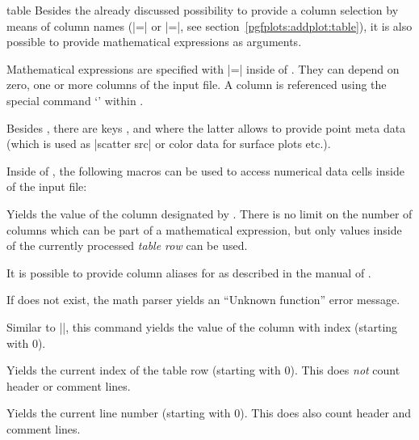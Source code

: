 \begin{addplotoperation}[]{table}{}
\label{pgfplots:addplot:table:expr}
	Besides the already discussed possibility to provide a column selection by means of column names (|=| or |=|, see section~\ref{pgfplots:addplot:table}), it is also possible to provide mathematical expressions as arguments.

	Mathematical expressions are specified with |=| inside of . They can depend on zero, one or more columns of the input file. A column is referenced using the special command `' within .
\begin{codeexample}[vbox]

\end{codeexample}

	Besides , there are keys ,  and  where the latter allows to provide point meta data (which is used as |scatter src| or color data for surface plots etc.).

	Inside of , the following macros can be used to access numerical data cells inside of the input file:

	\begin{command}{\thisrow{}}
		Yields the value of the column designated by . There is no limit on the number of columns which can be part of a mathematical expression, but only values inside of the currently processed \emph{table row} can be used.
		
		It is possible to provide column aliases for  as described in the manual of \PGFPlotstable. 

		If  does not exist, the math parser yields an ``Unknown function'' error message.
	\end{command}
	\begin{command}{\thisrowno{}}
		Similar to |\thisrow|, this command yields the value of the column with index  (starting with $0$). 
	\end{command}
	\begin{command}{\coordindex}
		Yields the current index of the table row (starting with $0$). This does \emph{not} count header or comment lines.		
	\end{command}
	\begin{command}{\lineno}
		Yields the current line number (starting with $0$). This does also count header and comment lines.
	\end{command}


\end{addplotoperation}
